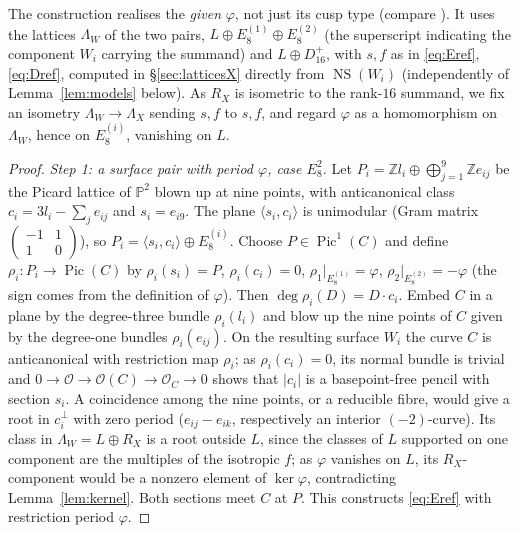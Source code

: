 \documentclass[11pt]{article}
\newcommand{\Z}{\mathbb Z}
\newcommand{\PP}{\mathbb P}
\newcommand{\NS}{\operatorname{NS}}
\newcommand{\Pic}{\operatorname{Pic}}
\theoremstyle{definition}
\theoremstyle{remark}
\begin{document}
The construction realises the \emph{given} \(\varphi\), not just its
cusp type (compare \cite[Proposition~7.23]{AE}). It uses the
lattices \(\Lambda_W\) of the two pairs,
\(L\oplus E_8^{(1)}\oplus E_8^{(2)}\) (the superscript indicating the
component \(W_i\) carrying the summand) and \(L\oplus D_{16}^+\), with
\(s,f\) as in \eqref{eq:Eref}, \eqref{eq:Dref}, computed in
\S\ref{sec:latticesX} directly from \(\NS(W_i)\) (independently of
Lemma~\ref{lem:models} below). As \(R_X\) is isometric to the rank-\(16\)
summand, we fix an isometry \(\Lambda_W\to\Lambda_X\) sending \(s,f\)
to \(s,f\), and regard \(\varphi\) as a homomorphism on \(\Lambda_W\),
hence on \(E_8^{(i)}\), vanishing on \(L\).

\begin{proof}
\emph{Step 1: a surface pair with period \(\varphi\), case \(E_8^2\).}
Let \(P_i=\Z l_i\oplus\bigoplus_{j=1}^9\Z e_{ij}\) be the Picard
lattice of \(\PP^2\) blown up at nine points, with anticanonical class
\(c_i=3l_i-\sum_je_{ij}\) and \(s_i=e_{i9}\). The plane
\(\langle s_i,c_i\rangle\) is unimodular (Gram matrix
\(\left(\begin{smallmatrix}-1&1\\1&0\end{smallmatrix}\right)\)), so
\(P_i=\langle s_i,c_i\rangle\oplus E_8^{(i)}\). Choose \(P\in\Pic^1(C)\)
and define \(\rho_i\colon P_i\to\Pic(C)\) by \(\rho_i(s_i)=P\),
\(\rho_i(c_i)=0\), \(\rho_1|_{E_8^{(1)}}=\varphi\),
\(\rho_2|_{E_8^{(2)}}=-\varphi\) (the sign comes from the definition
of \(\varphi\)).
Then \(\deg\rho_i(D)=D\cdot c_i\). Embed \(C\) in a plane by the
degree-three bundle \(\rho_i(l_i)\) and blow up the nine points of
\(C\) given by the degree-one bundles \(\rho_i(e_{ij})\). On the
resulting surface \(W_i\) the curve \(C\) is anticanonical with
restriction map \(\rho_i\); as \(\rho_i(c_i)=0\), its normal bundle is
trivial and \(0\to\mathcal O\to\mathcal O(C)\to\mathcal O_C\to0\)
shows that \(|c_i|\) is a basepoint-free pencil with section \(s_i\).
A coincidence among the nine points, or a reducible fibre, would give
a root in \(c_i^\perp\) with zero period (\(e_{ij}-e_{ik}\),
respectively an interior \((-2)\)-curve). Its class in
\(\Lambda_W=L\oplus R_X\) is a root outside \(L\), since the classes
of \(L\) supported on one component are the multiples of the
isotropic \(f\); as \(\varphi\) vanishes on \(L\), its
\(R_X\)-component would be a nonzero element of \(\ker\varphi\),
contradicting Lemma~\ref{lem:kernel}. Both sections meet \(C\) at
\(P\). This constructs \eqref{eq:Eref} with restriction period
\(\varphi\).


\end{proof}
\end{document}
